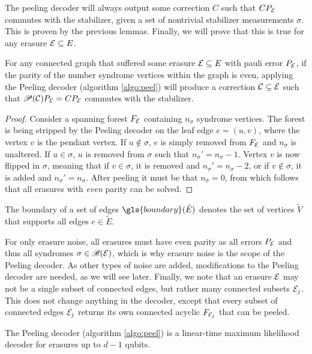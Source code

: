 The peeling decoder will always output some correction $C$ such that $CP_{\mathcal{E}}$ commutes with the stabilizer, given a set of nontrivial stabilizer measurements $\sigma$. This is proven by the previous lemmas. Finally, we will prove that this is true for any erasure $\mathcal{E}\subseteq E$. 
\begin{theorem}\label{eq:anyevenparity}
  For any connected graph that suffered some erasure $\mathcal{E}\subseteq E$ with pauli error $P_{\mathcal{E}}$, if the parity of the number syndrome vertices within the graph is even, applying the Peeling decoder (algorithm \ref{algo:peel}) will produce a correction $\mathcal{C}\subseteq \mathcal{E}$ such that $\mathscr{P}(\mathcal{C})P_{\mathcal{E}}=CP_{\mathcal{E}}$ commutes with the stabilizer.
\end{theorem}
\begin{proof}
  Consider a spanning forest $F_{\mathcal{E}}$ containing $n_\sigma$ syndrome vertices. The forest is being stripped by the Peeling decoder on the leaf edge $e = (u,v)$, where the vertex $v$ is the pendant vertex. If $u\notin\sigma$, $e$ is simply removed from $F_{\mathcal{E}}$ and $n_\sigma$ is unaltered. If $u\in\sigma$, $u$ is removed from $\sigma$ such that $n_\sigma'= n_\sigma -1$. Vertex $v$ is now flipped in $\sigma$, meaning that if $v\in\sigma$, it is removed and $n_\sigma'= n_\sigma -2$, or if  $v\notin\sigma$, it is added and $n_\sigma'= n_\sigma$. After peeling it must be that $n_\sigma=0$, from which follows that all erasures with \emph{even} parity can be solved. 
\end{proof}
\begin{definition}\label{def:boundaryofedges}
  The boundary of a set of edges $\gls{boundary}(\tilde{E})$ denotes the set of vertices $\tilde{V}$ that supports all edges $e\in \tilde{E}$. 
\end{definition}
For only erasure noise, all erasures must have even parity as all errors $P_{\mathcal{E}}$ and thus all syndromes $\sigma \in \mathscr{B}(\mathcal{E})$, which is why erasure noise is the scope of the Peeling decoder. As other types of noise are added, modifications to the Peeling decoder are needed, as we will see later. Finally, we note that an erasure $\mathcal{E}$ may not be a single subset of connected edges, but rather many connected subsets $\mathcal{E}_j$. This does not change anything in the decoder, except that every subset of connected edges $\mathcal{E}_j$ returns its own connected acyclic $F_{\mathcal{E}_j}$ that can be peeled. 
\begin{theorem}
  The Peeling decoder (algorithm \ref{algo:peel}) is a linear-time maximum likelihood decoder for erasures up to $d-1$ qubits. 
\end{theorem}
